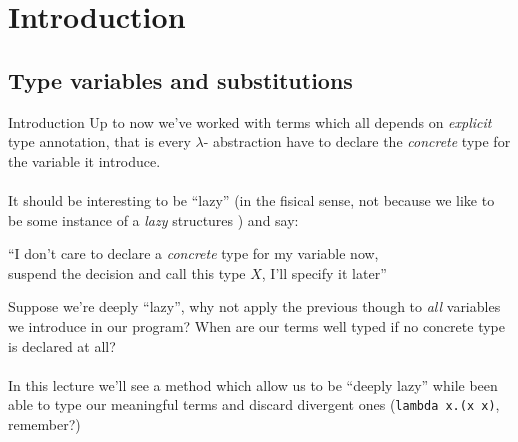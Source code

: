 \documentclass[8pt]{beamer}
\begin{document}
\section{Introduction}

\subsection{Type variables and substitutions}

\begin{frame}{Introduction}
    Up to now we've worked with terms which all depends on
    \emph{explicit} type annotation, that is every $\lambda$-
    abstraction have to declare the \emph{concrete} type for the variable
    it introduce. \\~\\
    \pause
    It should be interesting to be ``lazy'' (in the fisical sense, not
    because we like to be some instance of a \emph{lazy} structures 
    \smiley) and say:
    \begin{center}
        ``I don't care to declare a \emph{concrete} type for my variable now,\\
        suspend the decision and call this type $X$, I'll specify it later''
    \end{center}
    \pause 
    Suppose we're deeply ``lazy'', why not apply the previous though
    to \emph{all} variables we introduce in our program? When are our terms 
    well typed if no concrete type is declared at all? \\~\\
    \pause
    In this lecture we'll see a method which allow us to be ``deeply lazy''
    while been able to type our meaningful terms and discard divergent ones
    (\texttt{lambda x.(x x)}, remember?)
\end{frame}
\end{document}
